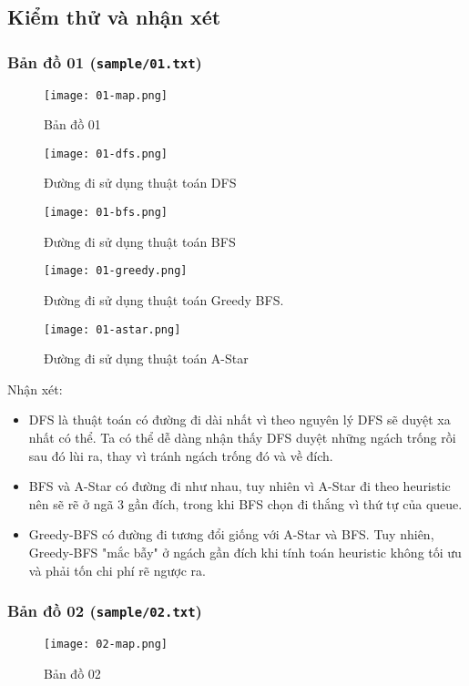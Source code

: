\documentclass{article}
\begin{document}
\subsection{Kiểm thử và nhận xét}
\subsubsection{Bản đồ 01 (\texttt{sample/01.txt})}
\begin{figure}[H]
\centering
\texttt{[image: 01-map.png]}
\caption{Bản đồ 01}
\end{figure}

\begin{figure}[H]
\centering
\texttt{[image: 01-dfs.png]}
\caption{Đường đi sử dụng thuật toán DFS}
\end{figure}

\begin{figure}[H]
\centering
\texttt{[image: 01-bfs.png]}
\caption{Đường đi sử dụng thuật toán BFS}
\end{figure}

\begin{figure}[H]
\centering
\texttt{[image: 01-greedy.png]}
\caption{Đường đi sử dụng thuật toán Greedy BFS.}
\end{figure}

\begin{figure}[H]
\centering
\texttt{[image: 01-astar.png]}
\caption{Đường đi sử dụng thuật toán A-Star}
\end{figure}


Nhận xét: 
\begin{itemize}
\item DFS là thuật toán có đường đi dài nhất vì theo nguyên lý DFS sẽ duyệt xa nhất có thể. Ta có thể dễ dàng nhận thấy DFS duyệt những ngách trống rồi sau đó lùi ra, thay vì tránh ngách trống đó và về đích.
\item BFS và A-Star có đường đi như nhau, tuy nhiên vì A-Star đi theo heuristic nên sẽ rẽ ở ngã 3 gần đích, trong khi BFS chọn đi thắng vì thứ tự của queue.
\item Greedy-BFS có đường đi tương đổi giống với A-Star và BFS. Tuy nhiên, Greedy-BFS "mắc bẫy" ở ngách gần đích khi tính toán heuristic không tối ưu và phải tốn chi phí rẽ ngược ra.
\end{itemize}

\subsubsection{Bản đồ 02 (\texttt{sample/02.txt})}
\begin{figure}[H]
	\centering
	\texttt{[image: 02-map.png]}
	\caption{Bản đồ 02}
\end{figure}
\end{document}
